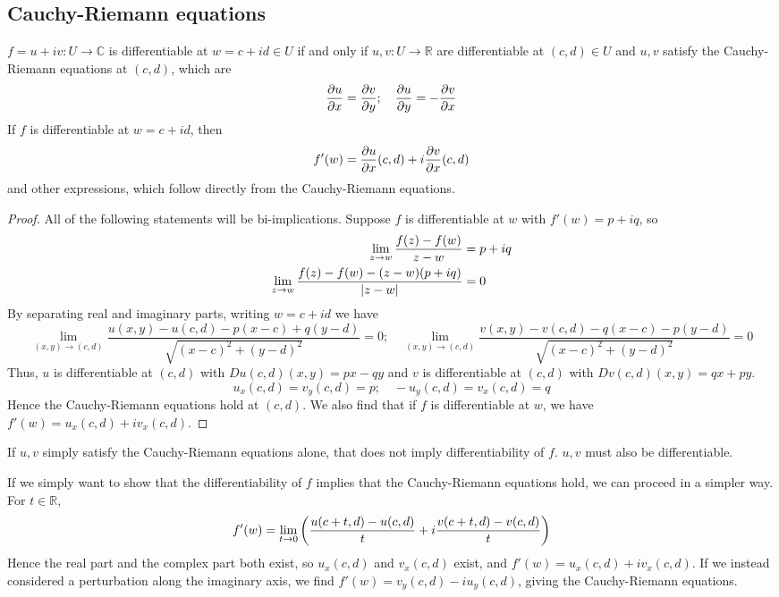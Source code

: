 \subsection{Cauchy-Riemann equations}
\begin{theorem}
	\( f = u + iv \colon U \to \mathbb C \) is differentiable at \( w = c + id \in U \) if and only if \( u,v \colon U \to \mathbb R \) are differentiable at \( (c,d) \in U \) and \( u,v \) satisfy the Cauchy-Riemann equations at \( (c,d) \), which are
	\[ \pdv{u}{x} = \pdv{v}{y};\quad \pdv{u}{y} = -\pdv{v}{x} \]
	If \( f \) is differentiable at \( w = c + id \), then
	\[ f'(w) = \pdv{u}{x}\qty(c,d) + i \pdv{v}{x}\qty(c,d) \]
	and other expressions, which follow directly from the Cauchy-Riemann equations.
\end{theorem}
\begin{proof}
	All of the following statements will be bi-implications.
	Suppose \( f \) is differentiable at \( w \) with \( f'(w) = p+iq \), so
	\begin{align*}
		\lim_{z \to w} \frac{f(z) - f(w)}{z-w} &= p+iq \\
		\lim_{z \to w} \frac{f(z) - f(w) - (z-w)(p+iq)}{\abs{z-w}} &= 0
	\end{align*}
	By separating real and imaginary parts, writing \( w = c + id \) we have
	\[ \lim_{(x,y) \to (c,d)} \frac{u(x,y) - u(c,d) - p(x-c) + q(y-d)}{\sqrt{(x-c)^2 + (y-d)^2}} = 0;\quad \lim_{(x,y) \to (c,d)} \frac{v(x,y) - v(c,d) - q(x-c) - p(y-d)}{\sqrt{(x-c)^2 + (y-d)^2}} = 0 \]
	Thus, \( u \) is differentiable at \( (c,d) \) with \( Du(c,d)(x,y) = px - qy \) and \( v \) is differentiable at \( (c,d) \) with \( Dv(c,d)(x,y) = qx + py \).
	\[ u_x(c,d) = v_y(c,d) = p;\quad -u_y(c,d) = v_x(c,d) = q \]
	Hence the Cauchy-Riemann equations hold at \( (c,d) \).
	We also find that if \( f \) is differentiable at \( w \), we have \( f'(w) = u_x(c,d) + i v_x(c,d) \).
\end{proof}
\begin{remark}
	If \( u,v \) simply satisfy the Cauchy-Riemann equations alone, that does not imply differentiability of \( f \).
	\( u,v \) must also be differentiable.
\end{remark}
\begin{remark}
	If we simply want to show that the differentiability of \( f \) implies that the Cauchy-Riemann equations hold, we can proceed in a simpler way.
	For \( t \in \mathbb R \),
	\[ f'(w) = \lim_{t \to 0} \qty(\frac{u(c+t,d) - u(c,d)}{t} + i \frac{v(c+t,d) - v(c,d)}{t}) \]
	Hence the real part and the complex part both exist, so \( u_x(c,d) \) and \( v_x(c,d) \) exist, and \( f'(w) = u_x(c,d) + i v_x(c,d) \).
	If we instead considered a perturbation along the imaginary axis, we find \( f'(w) = v_y(c,d) - iu_y(c,d) \), giving the Cauchy-Riemann equations.
\end{remark}
